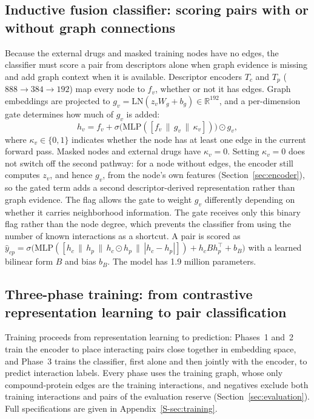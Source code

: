 \documentclass[10pt,letterpaper]{article}
\begin{document}
\subsection{Inductive fusion classifier: scoring pairs with or without graph connections}
\label{sec:fusion}
Because the external drugs and masked training nodes have no edges, the classifier must score a pair from descriptors alone when graph evidence is missing and add graph context when it is available. Descriptor encoders $T_c$ and $T_p$ ($888\to384\to192$) map every node to $f_v$, whether or not it has edges. Graph embeddings are projected to $g_v=\mathrm{LN}(z_vW_g+b_g)\in\mathbb{R}^{192}$, and a per-dimension gate determines how much of $g_v$ is added:
\begin{equation}
h_v = f_v + \sigma\!\big(\mathrm{MLP}([f_v\,\|\,g_v\,\|\,\kappa_v])\big)\odot g_v,
\label{eq:gate}
\end{equation}
where $\kappa_v\in\{0,1\}$ indicates whether the node has at least one edge in the current forward pass. Masked nodes and external drugs have $\kappa_v=0$. Setting $\kappa_v=0$ does not switch off the second pathway: for a node without edges, the encoder still computes $z_v$, and hence $g_v$, from the node's own features (Section~\ref{sec:encoder}), so the gated term adds a second descriptor-derived representation rather than graph evidence. The flag allows the gate to weight $g_v$ differently depending on whether it carries neighborhood information. The gate receives only this binary flag rather than the node degree, which prevents the classifier from using the number of known interactions as a shortcut. A pair is scored as $\hat{y}_{cp}=\sigma\big(\mathrm{MLP}([h_c\,\|\,h_p\,\|\,h_c\odot h_p\,\|\,|h_c-h_p|]) + h_cBh_p^{\top} + b_B\big)$ with a learned bilinear form $B$ and bias $b_B$. The model has 1.9 million parameters.

\subsection{Three-phase training: from contrastive representation learning to pair classification}
\label{sec:training}
Training proceeds from representation learning to prediction: Phases~1 and~2 train the encoder to place interacting pairs close together in embedding space, and Phase~3 trains the classifier, first alone and then jointly with the encoder, to predict interaction labels. Every phase uses the training graph, whose only compound-protein edges are the training interactions, and negatives exclude both training interactions and pairs of the evaluation reserve (Section~\ref{sec:evaluation}). Full specifications are given in Appendix~\ref{S-sec:training}.
\end{document}
